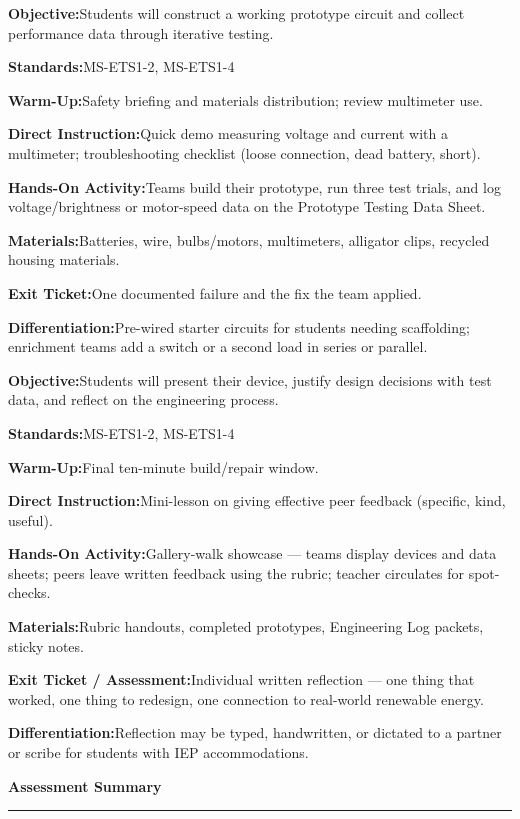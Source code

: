 \documentclass[11pt,a4paper,parskip=half]{scrartcl}
\newcommand{\plansection}[2]{%
  \vspace{12pt}%
  {\color{stemteal}\Large\bfseries #1\ \textcolor{stemamber}{\normalsize\faIcon{#2}}}\par
  {\color{stemamber}\rule{\linewidth}{1.1pt}}\par
  \vspace{4pt}%
}
\newcommand{\dayline}[2]{%
  \noindent\small\textcolor{stemteal}{\textbf{#1}}\quad\small #2\par\smallskip
}
\begin{document}
\vspace{4pt}
\begin{tcolorbox}[daybox,title={Thursday --- Build \& Test Prototypes}]
\dayline{Objective:}{Students will construct a working prototype circuit and collect performance data through iterative testing.}
\dayline{Standards:}{MS-ETS1-2, MS-ETS1-4}
\dayline{Warm-Up:}{Safety briefing and materials distribution; review multimeter use.}
\dayline{Direct Instruction:}{Quick demo measuring voltage and current with a multimeter; troubleshooting checklist (loose connection, dead battery, short).}
\dayline{Hands-On Activity:}{Teams build their prototype, run three test trials, and log voltage/brightness or motor-speed data on the Prototype Testing Data Sheet.}
\dayline{Materials:}{Batteries, wire, bulbs/motors, multimeters, alligator clips, recycled housing materials.}
\dayline{Exit Ticket:}{One documented failure and the fix the team applied.}
\dayline{Differentiation:}{Pre-wired starter circuits for students needing scaffolding; enrichment teams add a switch or a second load in series or parallel.}
\end{tcolorbox}

\vspace{4pt}
\begin{tcolorbox}[daybox,title={Friday --- Showcase, Testing \& Reflection}]
\dayline{Objective:}{Students will present their device, justify design decisions with test data, and reflect on the engineering process.}
\dayline{Standards:}{MS-ETS1-2, MS-ETS1-4}
\dayline{Warm-Up:}{Final ten-minute build/repair window.}
\dayline{Direct Instruction:}{Mini-lesson on giving effective peer feedback (specific, kind, useful).}
\dayline{Hands-On Activity:}{Gallery-walk showcase --- teams display devices and data sheets; peers leave written feedback using the rubric; teacher circulates for spot-checks.}
\dayline{Materials:}{Rubric handouts, completed prototypes, Engineering Log packets, sticky notes.}
\dayline{Exit Ticket / Assessment:}{Individual written reflection --- one thing that worked, one thing to redesign, one connection to real-world renewable energy.}
\dayline{Differentiation:}{Reflection may be typed, handwritten, or dictated to a partner or scribe for students with IEP accommodations.}
\end{tcolorbox}

\plansection{Assessment Summary}{clipboard}
\end{document}
